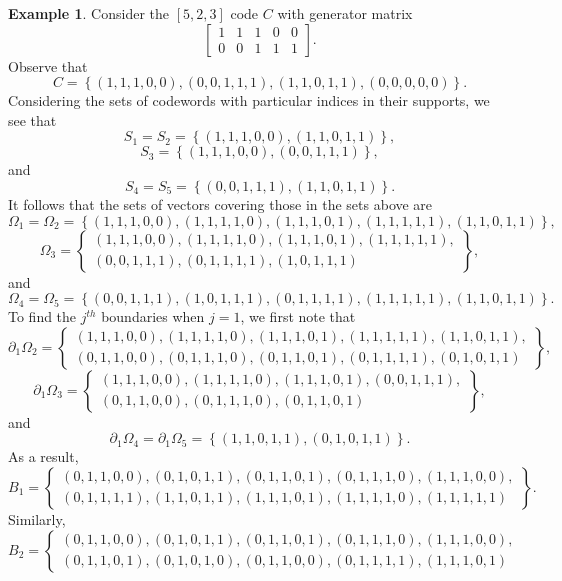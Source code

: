 \documentclass[12pt]{article}
\theoremstyle{definition}
\newtheorem{example}[theorem]{Example}
\begin{document}
\begin{example} \label{toy_ex}
Consider the $[5,2,3]$ code $C$ with generator matrix 
$$
\left[ 
\begin{array}{ccccc}
1 & 1 & 1 & 0 & 0 \\
0 & 0 & 1 & 1 & 1
\end{array}
\right]. 
$$
Observe that $$C=\left\{ (1,1,1,0,0),  (0,0,1,1,1), (1,1,0,1,1), (0,0,0,0,0) \right\}.$$ 
Considering the sets of codewords with particular indices in their supports, we see that $$S_1=S_2=\left\{ (1,1,1,0,0),(1,1,0,1,1) \right\},$$
$$S_3=\left\{ (1,1,1,0,0),(0,0,1,1,1) \right\},$$ and 
$$S_4=S_5=\left\{ (0,0,1,1,1),(1,1,0,1,1)   \right\}.$$
It follows that the sets of vectors covering those in the sets above are
$$\Omega_1=\Omega_2=\left\{ (1,1,1,0,0),(1,1,1,1,0),(1,1,1,0,1),(1,1,1,1,1),(1,1,0,1,1) \right\},$$
$$\Omega_3=\left\{ \begin{array}{l}(1,1,1,0,0),(1,1,1,1,0),(1,1,1,0,1),(1,1,1,1,1), \\ (0,0,1,1,1),(0,1,1,1,1),(1,0,1,1,1) \end{array} \right\},$$ and 
$$\Omega_4=\Omega_5=\left\{ (0,0,1,1,1), (1,0,1,1,1), (0,1,1,1,1), (1,1,1,1,1),(1,1,0,1,1)   \right\}.$$
To find the $j^{th}$ boundaries when $j=1$, we first note that 
$$\partial_1 \Omega_2
=\left\{ \begin{array}{l} (1,1,1,0,0), (1,1,1,1,0),(1,1,1,0,1),(1,1,1,1,1),(1,1,0,1,1),\\ (0,1,1,0,0),(0,1,1,1,0),(0,1,1,0,1),(0,1,1,1,1),(0,1,0,1,1) \end{array} \right\},$$
$$ \partial_1 \Omega_3
=\left\{ \begin{array}{l}(1,1,1,0,0), (1,1,1,1,0),(1,1,1,0,1),
(0,0,1,1,1),\\(0,1,1,0,0),(0,1,1,1,0),(0,1,1,0,1) \end{array} \right\},$$ and 
$$ \partial_1 \Omega_4
=\partial_1 \Omega_5=\left\{ (1,1,0,1,1),(0,1,0, 1,1)\right\}.$$As a result, 
$$
B_1=\left\{ 
\begin{array}{l}
(0,1,1,0,0),
(0,1,0,1,1),
(0,1,1,0,1),
(0,1,1,1,0),
(1,1,1,0,0), \\
(0,1,1,1,1),
(1,1,0,1,1),
(1,1,1,0,1),
(1,1,1,1,0),
(1,1,1,1,1)
\end{array}
\right\}.$$
Similarly, 
$$
B_2=\left\{ 
\begin{array}{l}
(0,1,1,0,0),
(0,1,0,1,1),
(0,1,1,0,1),
(0,1,1,1,0),
(1,1,1,0,0), \\
(0,1,1,0,1),
(0,1,0,1,0),
(0,1,1,0,0),
(0,1,1,1,1),
(1,1,1,0,1)
\end{array}
$$
\end{example}
\end{document}
